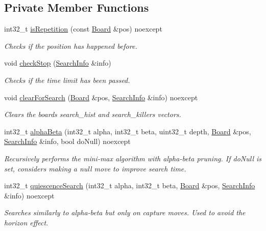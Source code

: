 \subsection*{Private Member Functions}
\begin{DoxyCompactItemize}
\item 
int32\+\_\+t \mbox{\hyperlink{classSearchAgent_acbc393afa5ab599c1bf3ffcd279b60a7}{is\+Repetition}} (const \mbox{\hyperlink{classBoard}{Board}} \&pos) noexcept
\begin{DoxyCompactList}\small\item\em Checks if the position has happened before. \end{DoxyCompactList}\item 
void \mbox{\hyperlink{classSearchAgent_aff45768956489f9696ff62c8db26db6b}{check\+Stop}} (\mbox{\hyperlink{structSearchInfo}{Search\+Info}} \&info)
\begin{DoxyCompactList}\small\item\em Checks if the time limit has been passed. \end{DoxyCompactList}\item 
void \mbox{\hyperlink{classSearchAgent_a5f8153e871a9030a537684323668a1cd}{clear\+For\+Search}} (\mbox{\hyperlink{classBoard}{Board}} \&pos, \mbox{\hyperlink{structSearchInfo}{Search\+Info}} \&info) noexcept
\begin{DoxyCompactList}\small\item\em Clears the board\textquotesingle{}s search\+\_\+hist and search\+\_\+killers vectors. \end{DoxyCompactList}\item 
int32\+\_\+t \mbox{\hyperlink{classSearchAgent_a276e7dc17f276cf7d1c5fe91218f55c2}{alpha\+Beta}} (int32\+\_\+t alpha, int32\+\_\+t beta, uint32\+\_\+t depth, \mbox{\hyperlink{classBoard}{Board}} \&pos, \mbox{\hyperlink{structSearchInfo}{Search\+Info}} \&info, bool do\+Null) noexcept
\begin{DoxyCompactList}\small\item\em Recursively performs the mini-\/max algorithm with alpha-\/beta pruning. If do\+Null is set, considers making a null move to improve search time. \end{DoxyCompactList}\item 
int32\+\_\+t \mbox{\hyperlink{classSearchAgent_a0a66b7b202216f6e794a963df3a83cb2}{quiescence\+Search}} (int32\+\_\+t alpha, int32\+\_\+t beta, \mbox{\hyperlink{classBoard}{Board}} \&pos, \mbox{\hyperlink{structSearchInfo}{Search\+Info}} \&info) noexcept
\begin{DoxyCompactList}\small\item\em Searches similarly to alpha-\/beta but only on capture moves. Used to avoid the horizon effect. ~\newline

\end{DoxyCompactList}
\end{DoxyCompactItemize}
